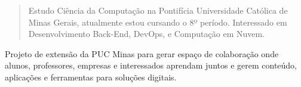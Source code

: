 \documentclass[10pt,a4paper,ragged2e,withhyper]{altacv}
\begin{document}
\begin{paracol}{2}

        
        
        
        
        
        \newpage
        
        \switchcolumn
        
            \begin{quote}
                Estudo Ciência da Computação na Pontifícia Universidade Católica de Minas Gerais, atualmente estou cursando o 8º período. Interessado em Desenvolvimento Back-End, DevOps, e Computação em Nuvem.
            \end{quote}
        
            Projeto de extensão da PUC Minas para gerar espaço de colaboração onde alunos, professores, empresas e interessados aprendam juntos e gerem conteúdo, aplicações e ferramentas para soluções digitais.


\end{paracol}
\end{document}
